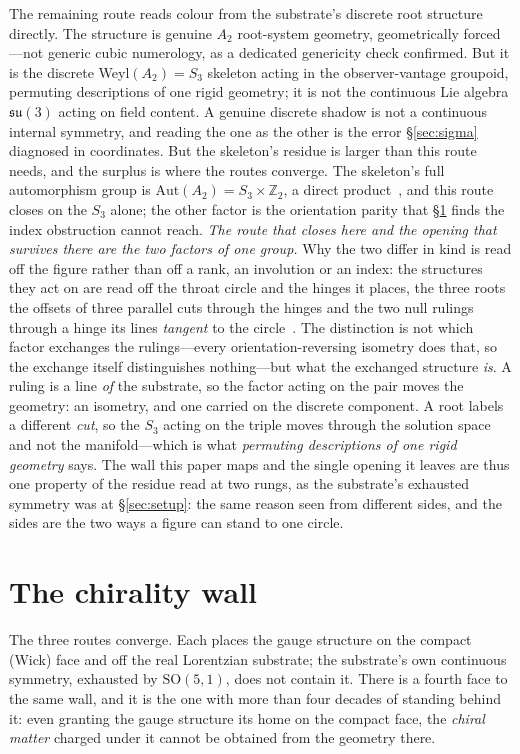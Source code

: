 \documentclass[11pt]{article}
\theoremstyle{plain}
\theoremstyle{remark}
\newcommand{\su}{\mathfrak{su}}
\newcommand{\SO}{\mathrm{SO}}
\begin{document}
The remaining route reads colour from the substrate's discrete root structure directly. The structure is genuine $A_2$ root-system geometry, geometrically forced---not generic cubic numerology, as a dedicated genericity check confirmed. But it is the discrete Weyl$(A_2)=S_3$ skeleton acting in the observer-vantage groupoid, permuting descriptions of one rigid geometry; it is not the continuous Lie algebra $\su(3)$ acting on field content. A genuine discrete shadow is not a continuous internal symmetry, and reading the one as the other is the error \S\ref{sec:sigma} diagnosed in coordinates. But the skeleton's residue is larger than this route needs, and the surplus is where the routes converge. The skeleton's full automorphism group is $\mathrm{Aut}(A_2)=S_3\times\mathbb{Z}_2$, a direct product~\cite{JanzenAlgebroid}, and this route closes on the $S_3$ alone; the other factor is the orientation parity that \S\ref{sec:wall} finds the index obstruction cannot reach. \emph{The route that closes here and the opening that survives there are the two factors of one group.} Why the two differ in kind is read off the figure rather than off a rank, an involution or an index: the structures they act on are read off the throat circle and the hinges it places, the three roots the offsets of three parallel cuts through the hinges and the two null rulings through a hinge its lines \emph{tangent} to the circle~\cite{JanzenSlicing,JanzenGeometricCore}. The distinction is not which factor exchanges the rulings---every orientation-reversing isometry does that, so the exchange itself distinguishes nothing---but what the exchanged structure \emph{is}. A ruling is a line \emph{of} the substrate, so the factor acting on the pair moves the geometry: an isometry, and one carried on the discrete component. A root labels a different \emph{cut}, so the $S_3$ acting on the triple moves through the solution space and not the manifold---which is what \emph{permuting descriptions of one rigid geometry} says. The wall this paper maps and the single opening it leaves are thus one property of the residue read at two rungs, as the substrate's exhausted symmetry was at \S\ref{sec:setup}: the same reason seen from different sides, and the sides are the two ways a figure can stand to one circle.

\section{The chirality wall}\label{sec:wall}

The three routes converge. Each places the gauge structure on the compact (Wick) face and off the real Lorentzian substrate; the substrate's own continuous symmetry, exhausted by $\SO(5,1)$, does not contain it. There is a fourth face to the same wall, and it is the one with more than four decades of standing behind it: even granting the gauge structure its home on the compact face, the \emph{chiral matter} charged under it cannot be obtained from the geometry there.
\end{document}
